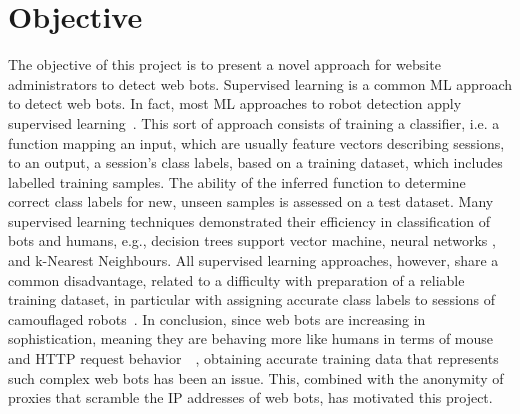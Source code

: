 \section{Objective}\label{sec:objective}
The objective of this project is to present a novel approach for website administrators to detect web bots.
Supervised learning is a common ML approach to detect web bots.
In fact, most ML approaches to robot detection apply supervised learning~\cite{10.1145/3339252.3339267}.
This sort of approach consists of training a classifier, i.e.
a function mapping an input, which are usually feature vectors describing sessions, to an output, a session’s class labels, based on a training dataset, which includes labelled training samples.
The ability of the inferred function to determine correct class labels for new, unseen samples is assessed on a test dataset.
Many supervised learning techniques demonstrated their efficiency in classification of bots and humans, e.g., decision trees support vector machine, neural networks , and k-Nearest Neighbours.
All supervised learning approaches, however, share a common disadvantage, related to a difficulty with preparation of a reliable training dataset, in particular with assigning accurate class labels to sessions of camouflaged robots~\cite{ROVETTA2020102577}.
In conclusion, since web bots are increasing in sophistication, meaning they are behaving more like humans in terms of mouse and HTTP request behavior~\cite{10.1109/DSN.2013.6575366}~\cite{7371507}, obtaining accurate training data that represents such complex web bots has been an issue.
This, combined with the anonymity of proxies that scramble the IP addresses of web bots, has motivated this project.

